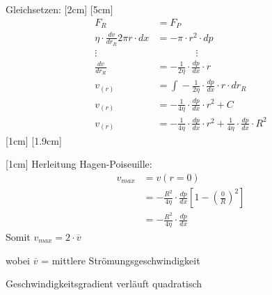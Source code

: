 \documentclass[a4paper,10pt,twoside]{article}
\begin{document}
Gleichsetzen:
[2cm]
\marginnote[$C = \frac{1}{4 \eta} \cdot \frac{dp}{dx} \cdot R^2$]{}[5cm]
\begin{align*}
F_R &= F_P \\
\eta \cdot \frac{dv}{dr_R} 2\pi r \cdot dx &= -\pi \cdot r^2 \cdot dp \\
\vdots & \qquad \qquad \vdots \\
\frac{dv}{dr_R}  &= -\frac{1}{2\eta} \cdot \frac{dp}{dx} \cdot r \\
v_{(r)} &= \int_{}{} - \frac{1}{2\eta} \cdot \frac{dp}{dx} \cdot r \cdot dr_R \\
v_{(r)} &= -\frac{1}{4 \eta} \cdot \frac{dp}{dx} \cdot r^2  +C \\
v_{(r)} &= -\frac{1}{4 \eta} \cdot \frac{dp}{dx} \cdot r^2  +\frac{1}{4 \eta} \cdot \frac{dp}{dx} \cdot R^2 
\end{align*}
[1cm]
\marginnote[$l$ = Länge des Rohres \pp $v = 0$ wenn innerer Radius $r$ gleich Mantelradius $R$\pp $v(r=R)=0$]{}[1.9cm]

\reversemarginpar
\marginnote[$v_{max}$ ist am größten, wenn $r = 0$]{}[1cm]
\pp
Herleitung Hagen-Poiseuille:
\begin{align*}
v_{max} &= v (r = 0) \\
		&= -\frac{R^2}{4 \eta} \cdot \frac{dp}{dx} \left[1- (\frac{0}{R})^2 \right]  \\
		&= -\frac{R^2}{4 \eta} \cdot \frac{dp}{dx}
\end{align*}
Somit $v_{max} = 2 \cdot \overline{v}$ \par wobei $\overline{v}$ = mittlere Strömungsgeschwindigkeit \par \RA Geschwindigkeitsgradient verläuft quadratisch



\end{document}
